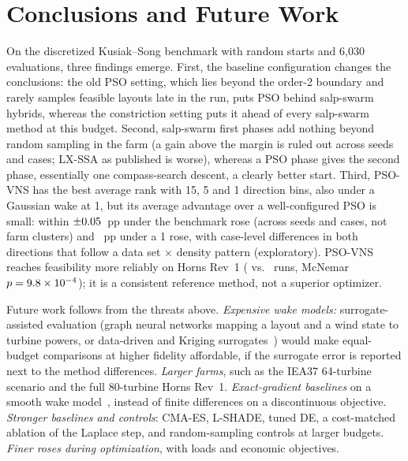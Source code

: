 \section{Conclusions and Future Work}
\label{sec:conclusion}
On the discretized Kusiak--Song benchmark with random starts and 6,030 evaluations, three findings emerge. First, the baseline configuration changes the conclusions: the old PSO setting, which lies beyond the order-2 boundary and rarely samples feasible layouts late in the run, puts PSO behind salp-swarm hybrids, whereas the constriction setting puts it ahead of every salp-swarm method at this budget. Second, salp-swarm first phases add nothing beyond random sampling in the farm (a gain above the margin is ruled out across seeds and cases; LX-SSA as published is worse), whereas a PSO phase gives the second phase, essentially one compass-search descent, a clearly better start. Third, PSO-VNS has the best average rank with 15\textdegree{}, 5\textdegree{} and 1\textdegree{} direction bins, also under a Gaussian wake at 1\textdegree{}, but its average advantage over a well-configured PSO is small: within $\pm0.05$~pp under the benchmark rose (across seeds and cases, not farm clusters) and \NFPairMeanOne~pp under a 1\textdegree{} rose, with case-level differences in both directions that follow a data set $\times$ density pattern (exploratory). PSO-VNS reaches feasibility more reliably on Horns Rev~1 (\NHRFeasPSOVNS{} vs.\ \NHRFeasPSO{} runs, McNemar $p=9.8\times10^{-4}$); it is a consistent reference method, not a superior optimizer.

Future work follows from the threats above. \emph{Expensive wake models:} surrogate-assisted evaluation (graph neural networks mapping a layout and a wind state to turbine powers, or data-driven and Kriging surrogates~\cite{Yang2023,Wang2024,Li2025}) would make equal-budget comparisons at higher fidelity affordable, if the surrogate error is reported next to the method differences. \emph{Larger farms}, such as the IEA37 64-turbine scenario and the full 80-turbine Horns Rev~1. \emph{Exact-gradient baselines} on a smooth wake model~\cite{Thomas2023}, instead of finite differences on a discontinuous objective. \emph{Stronger baselines and controls}: CMA-ES, L-SHADE, tuned DE, a cost-matched ablation of the Laplace step, and random-sampling controls at larger budgets. \emph{Finer roses during optimization}, with loads and economic objectives.
